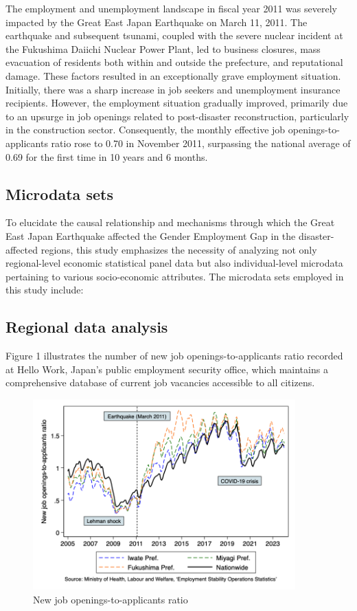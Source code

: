 \documentclass[12pt,halfline,a4paper]{ouparticle}
\begin{document}
The employment and unemployment landscape in fiscal year 2011 was severely impacted by the Great East Japan Earthquake on March 11, 2011. The earthquake and subsequent tsunami, coupled with the severe nuclear incident at the Fukushima Daiichi Nuclear Power Plant, led to business closures, mass evacuation of residents both within and outside the prefecture, and reputational damage. These factors resulted in an exceptionally grave employment situation. Initially, there was a sharp increase in job seekers and unemployment insurance recipients. However, the employment situation gradually improved, primarily due to an upsurge in job openings related to post-disaster reconstruction, particularly in the construction sector. Consequently, the monthly effective job openings-to-applicants ratio rose to 0.70 in November 2011, surpassing the national average of 0.69 for the first time in 10 years and 6 months.


\subsection{Microdata sets}
\label{sec4.1}

To elucidate the causal relationship and mechanisms through which the Great East Japan Earthquake affected the Gender Employment Gap in the disaster-affected regions, this study emphasizes the necessity of analyzing not only regional-level economic statistical panel data but also individual-level microdata pertaining to various socio-economic attributes. The microdata sets employed in this study include:

\subsection{Regional data analysis}
\label{sec4.1}

Figure 1 illustrates the number of new job openings-to-applicants ratio recorded at Hello Work, Japan’s public employment security office, which maintains a comprehensive database of current job vacancies accessible to all citizens. 

\begin{figure}[h!]
    \centering
    \includegraphics[width=0.9\textwidth]{New job openings-to-applicants ratio.png}  %
    \caption{New job openings-to-applicants ratio}
    \label{fig:new_job_openings}
\end{figure}
\end{document}
